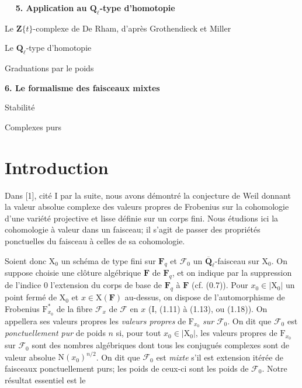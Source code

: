 \documentclass[11pt,leqno]{article}
\newcommand{\Page}[1]{\ifvmode\noindent\else\unskip\ \fi{\footnotesize\textcolor{gray}{[p.\,#1]}}\ \ignorespaces}
\begin{document}
\Page{138}
\begingroup
\small
\noindent\textbf{5. Application au \(\mathbf{Q}_\ell\)-type d’homotopie}\dotfill{}\par
\noindent\hspace*{1em}Le \(\mathbf{Z}\{t\}\)-complexe de De Rham, d’après Grothendieck et Miller\dotfill{}\par
\noindent\hspace*{1em}Le \(\mathbf{Q}_\ell\)-type d’homotopie\dotfill{}\par
\noindent\hspace*{1em}Graduations par le poids\dotfill{}\par
\medskip
\noindent\textbf{6. Le formalisme des faisceaux mixtes}\dotfill{}\par
\noindent\hspace*{1em}Stabilité\dotfill{}\par
\noindent\hspace*{1em}Complexes purs\dotfill{}\par
\endgroup

\section*{Introduction}

Dans [1], cité I par la suite, nous avons démontré la conjecture de Weil donnant la valeur absolue complexe des valeurs propres de Frobenius sur la cohomologie d’une variété projective et lisse définie sur un corps fini. Nous étudions ici la cohomologie à valeur dans un faisceau; il s’agit de passer des propriétés ponctuelles du faisceau à celles de sa cohomologie.

Soient donc \(\mathrm{X}_0\) un schéma de type fini sur \(\mathbf{F}_q\) et \(\mathscr{F}_0\) un \(\overline{\mathbf{Q}}_\ell\)-faisceau sur \(\mathrm{X}_0\). On suppose choisie une clôture algébrique \(\mathbf{F}\) de \(\mathbf{F}_q\), et on indique par la suppression de l’indice 0 l’extension du corps de base de \(\mathbf{F}_q\) à \(\mathbf{F}\) (cf. (0.7)). Pour \(x_0\in|\mathrm{X}_0|\) un point fermé de \(\mathrm{X}_0\) et \(x\in\mathrm{X}(\mathbf{F})\) au-dessus, on dispose de l’automorphisme de Frobenius \(\mathrm{F}_{x_0}^{*}\) de la fibre \(\mathscr{F}_x\) de \(\mathscr{F}\) en \(x\) (I, (1.11) à (1.13), ou (1.18)). On appellera ses valeurs propres les \textit{valeurs propres} de \(\mathrm{F}_{x_0}\) \textit{sur} \(\mathscr{F}_0\). On dit que \(\mathscr{F}_0\) est \textit{ponctuellement pur} de poids \(n\) si, pour tout \(x_0\in|\mathrm{X}_0|\), les valeurs propres de \(\mathrm{F}_{x_0}\) sur \(\mathscr{F}_0\) sont des nombres algébriques dont tous les conjugués complexes sont de valeur absolue \(\mathrm{N}(x_0)^{n/2}\). On dit que \(\mathscr{F}_0\) est \textit{mixte} s’il est extension itérée de faisceaux ponctuellement purs; les poids de ceux-ci sont les poids de \(\mathscr{F}_0\). Notre résultat essentiel est le
\end{document}
